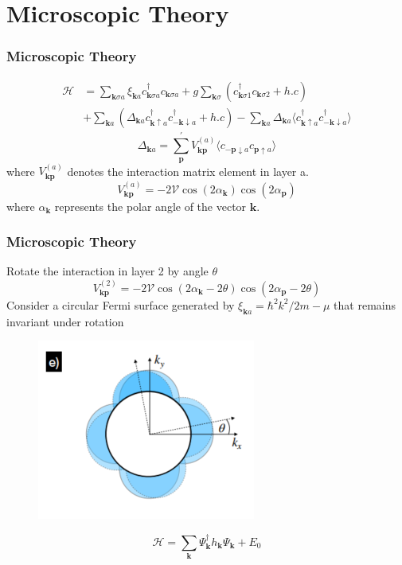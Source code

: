\documentclass{beamer}
\begin{document}
\section{Microscopic Theory}
\begin{frame}
\frametitle{Microscopic Theory}
\begin{equation}
\begin{aligned}
\mathcal{H}&=\sum_{\mathbf{k}\sigma a}\xi_{\mathbf{k}a}c^\dagger_{\mathbf{k}\sigma a}c_{\mathbf{k}\sigma a}+g\sum_{\mathbf{k}\sigma}(c^\dagger_{\mathbf{k}\sigma 1}c_{\mathbf{k}\sigma 2}+h.c)\\
&+\sum_{\mathbf{k}a}(\Delta_{\mathbf{k}a}c^\dagger_{\mathbf{k}\uparrow a}c^\dagger_{-\mathbf{k}\downarrow a}+h.c)-\sum_{\mathbf{k}a}\Delta_{\mathbf{k}a}\langle c^\dagger_{\mathbf{k}\uparrow a}c^\dagger_{-\mathbf{k}\downarrow a}\rangle
\end{aligned}
\end{equation}
\begin{equation}
\Delta_{\mathbf{k}a}=\sum_\mathbf{p}^{'}V_\mathbf{kp}^{(a)}\langle c_{-\mathbf{p}\downarrow a}c_{\mathbf{p}\uparrow a} \rangle
\end{equation}
where $V^{(a)}_{\mathbf{kp}}$ denotes the interaction matrix element in layer a.
\begin{equation}
V^{(a)}_\mathbf{kp}=-2\mathcal{V}\cos(2\alpha_\mathbf{k})\cos(2\alpha_\mathbf{p})
\end{equation}
where $\alpha_\mathbf{k}$ represents the polar angle of the vector $\mathbf{k}$. 
\end{frame}
\begin{frame}
\frametitle{Microscopic Theory}
Rotate the interaction in layer 2 by angle $\theta$
\begin{equation}
V^{(2)}_\mathbf{kp}=-2\mathcal{V}\cos(2\alpha_\mathbf{k}-2\theta)\cos(2\alpha_\mathbf{p}-2\theta)
\end{equation}
Consider a circular Fermi surface generated by $\xi_{\mathbf{k}a}=\hbar^2k^2/2m-\mu$ that remains invariant under rotation	
\begin{figure}
\centering
\includegraphics[scale=0.6]{pic/p8.png}
\end{figure}
\begin{equation}
\mathcal{H}=\sum_\mathbf{k}\Psi^\dagger_\mathbf{k}h_\mathbf{k}\Psi_\mathbf{k}+E_0
\end{equation}
\end{frame}
\end{document}
